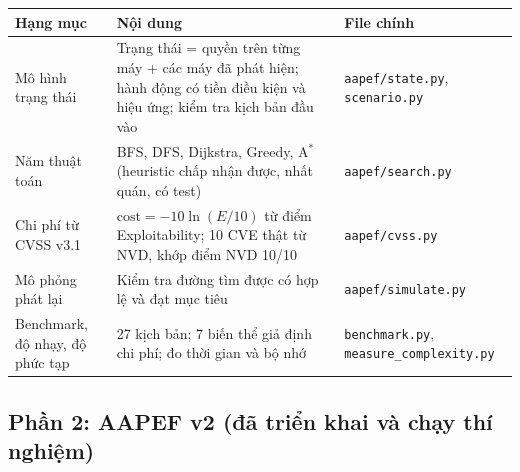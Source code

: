 \documentclass[11pt,a4paper]{article}
\begin{document}
\begin{center}
\small
\begin{tabular}{@{}Y{4.2cm}Y{8.2cm}Y{3.6cm}@{}}
\toprule
\textbf{Hạng mục} & \textbf{Nội dung} & \textbf{File chính} \\
\midrule
Mô hình trạng thái & Trạng thái = quyền trên từng máy + các máy đã phát hiện; hành động có tiền điều kiện và hiệu ứng; kiểm tra kịch bản đầu vào & \texttt{aapef/state.py}, \texttt{scenario.py} \\
Năm thuật toán & BFS, DFS, Dijkstra, Greedy, A$^{*}$ (heuristic chấp nhận được, nhất quán, có test) & \texttt{aapef/search.py} \\
Chi phí từ CVSS v3.1 & $\text{cost} = -10\ln(E/10)$ từ điểm Exploitability; 10 CVE thật từ NVD, khớp điểm NVD 10/10 & \texttt{aapef/cvss.py} \\
Mô phỏng phát lại & Kiểm tra đường tìm được có hợp lệ và đạt mục tiêu & \texttt{aapef/simulate.py} \\
Benchmark, độ nhạy, độ phức tạp & 27 kịch bản; 7 biến thể giả định chi phí; đo thời gian và bộ nhớ & \texttt{benchmark.py}, \texttt{measure\_complexity.py} \\
\bottomrule
\end{tabular}
\end{center}

\subsection{Phần 2: AAPEF v2 (đã triển khai và chạy thí nghiệm)}
\end{document}
